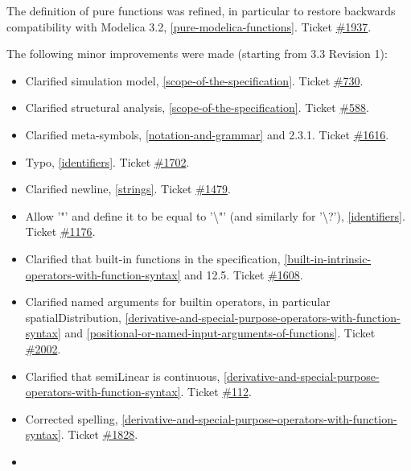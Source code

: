 \documentclass[../MLS.tex]{subfiles}
\begin{document}
The definition of pure functions was refined, in particular to restore
backwards compatibility with Modelica 3.2, \autoref{pure-modelica-functions}. Ticket
\href{https://trac.modelica.org/Modelica/ticket/1937}{\#1937}.

The following minor improvements were made (starting from 3.3 Revision
1):

\begin{itemize}
\item
  Clarified simulation model, \autoref{scope-of-the-specification}. Ticket
  \href{https://trac.modelica.org/Modelica/ticket/730}{\#730}.
\item
  Clarified structural analysis, \autoref{scope-of-the-specification}. Ticket
  \href{https://trac.modelica.org/Modelica/ticket/588}{\#588}.
\item
  Clarified meta-symbols, \autoref{notation-and-grammar} and 2.3.1. Ticket
  \href{https://trac.modelica.org/Modelica/ticket/1616}{\#1616}.
\item
  Typo, \autoref{identifiers}. Ticket
  \href{https://trac.modelica.org/Modelica/ticket/1702}{\#1702}.
\item
  Clarified newline, \autoref{strings}. Ticket
  \href{https://trac.modelica.org/Modelica/ticket/1479}{\#1479}.
\item
  Allow '"' and define it to be equal to '\textbackslash{}"' (and
  similarly for '\textbackslash{}?'), \autoref{identifiers}. Ticket
  \href{https://trac.modelica.org/Modelica/ticket/1176}{\#1176}.
\item
  Clarified that built-in functions in the specification, \autoref{built-in-intrinsic-operators-with-function-syntax}
  and 12.5. Ticket
  \href{https://trac.modelica.org/Modelica/ticket/1608}{\#1608}.
\item
  Clarified named arguments for builtin operators, in particular
  spatialDistribution, \autoref{derivative-and-special-purpose-operators-with-function-syntax} and \autoref{positional-or-named-input-arguments-of-functions}. Ticket
  \href{https://trac.modelica.org/Modelica/ticket/2002}{\#2002}.
\item
  Clarified that semiLinear is continuous, \autoref{derivative-and-special-purpose-operators-with-function-syntax}. Ticket
  \href{https://trac.modelica.org/Modelica/ticket/112}{\#112}.
\item
  Corrected spelling, \autoref{derivative-and-special-purpose-operators-with-function-syntax}. Ticket
  \href{https://trac.modelica.org/Modelica/ticket/1828}{\#1828}.
\item

\end{itemize}
\end{document}
